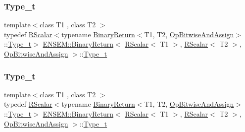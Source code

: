 \subsubsection{\texorpdfstring{Type\_t}{Type\_t}\hspace{0.1cm}{\footnotesize\ttfamily [2/3]}}
{\footnotesize\ttfamily template$<$class T1 , class T2 $>$ \\
typedef \mbox{\hyperlink{classENSEM_1_1RScalar}{R\+Scalar}}$<$typename \mbox{\hyperlink{structENSEM_1_1BinaryReturn}{Binary\+Return}}$<$T1, T2, \mbox{\hyperlink{structENSEM_1_1OpBitwiseAndAssign}{Op\+Bitwise\+And\+Assign}}$>$\+::\mbox{\hyperlink{structENSEM_1_1BinaryReturn_3_01RScalar_3_01T1_01_4_00_01RScalar_3_01T2_01_4_00_01OpBitwiseAndAssign_01_4_a465f70838ae6baf7c8bf08d58bd95cfa}{Type\+\_\+t}}$>$ \mbox{\hyperlink{structENSEM_1_1BinaryReturn}{E\+N\+S\+E\+M\+::\+Binary\+Return}}$<$ \mbox{\hyperlink{classENSEM_1_1RScalar}{R\+Scalar}}$<$ T1 $>$, \mbox{\hyperlink{classENSEM_1_1RScalar}{R\+Scalar}}$<$ T2 $>$, \mbox{\hyperlink{structENSEM_1_1OpBitwiseAndAssign}{Op\+Bitwise\+And\+Assign}} $>$\+::\mbox{\hyperlink{structENSEM_1_1BinaryReturn_3_01RScalar_3_01T1_01_4_00_01RScalar_3_01T2_01_4_00_01OpBitwiseAndAssign_01_4_a465f70838ae6baf7c8bf08d58bd95cfa}{Type\+\_\+t}}}

\mbox{\label{structENSEM_1_1BinaryReturn_3_01RScalar_3_01T1_01_4_00_01RScalar_3_01T2_01_4_00_01OpBitwiseAndAssign_01_4_a465f70838ae6baf7c8bf08d58bd95cfa}} 
\subsubsection{\texorpdfstring{Type\_t}{Type\_t}\hspace{0.1cm}{\footnotesize\ttfamily [3/3]}}
{\footnotesize\ttfamily template$<$class T1 , class T2 $>$ \\
typedef \mbox{\hyperlink{classENSEM_1_1RScalar}{R\+Scalar}}$<$typename \mbox{\hyperlink{structENSEM_1_1BinaryReturn}{Binary\+Return}}$<$T1, T2, \mbox{\hyperlink{structENSEM_1_1OpBitwiseAndAssign}{Op\+Bitwise\+And\+Assign}}$>$\+::\mbox{\hyperlink{structENSEM_1_1BinaryReturn_3_01RScalar_3_01T1_01_4_00_01RScalar_3_01T2_01_4_00_01OpBitwiseAndAssign_01_4_a465f70838ae6baf7c8bf08d58bd95cfa}{Type\+\_\+t}}$>$ \mbox{\hyperlink{structENSEM_1_1BinaryReturn}{E\+N\+S\+E\+M\+::\+Binary\+Return}}$<$ \mbox{\hyperlink{classENSEM_1_1RScalar}{R\+Scalar}}$<$ T1 $>$, \mbox{\hyperlink{classENSEM_1_1RScalar}{R\+Scalar}}$<$ T2 $>$, \mbox{\hyperlink{structENSEM_1_1OpBitwiseAndAssign}{Op\+Bitwise\+And\+Assign}} $>$\+::\mbox{\hyperlink{structENSEM_1_1BinaryReturn_3_01RScalar_3_01T1_01_4_00_01RScalar_3_01T2_01_4_00_01OpBitwiseAndAssign_01_4_a465f70838ae6baf7c8bf08d58bd95cfa}{Type\+\_\+t}}}




